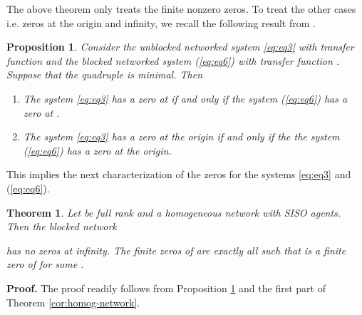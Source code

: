 \documentclass[twocolumn]{autart}    \usepackage{amsmath}
\newtheorem{theorem}{Theorem}
\newtheorem{proposition}{Proposition}
\begin{document}
\hfill 


The above theorem only treats the finite nonzero zeros. To treat the
other cases i.e. zeros at the origin and infinity, we recall the following
result from \cite{MOHSEN-SCLpaper}.

\begin{proposition}\label{thm:zeroatinfinity}
Consider the  unblocked networked  system \eqref{eq:eq3} with  transfer
function   and the  blocked networked  system  (\ref{eq:eq6})
with transfer function . Suppose that  the quadruple
 is minimal. Then
\begin{enumerate}
\item The system \eqref{eq:eq3} has a zero at    if  and only if the system (\ref{eq:eq6})  has a zero at .
\item The system \eqref{eq:eq3} has a zero at the origin if and only if the   the system (\ref{eq:eq6})  has a zero at  the origin.
\end{enumerate}
\end{proposition}

This implies the next characterization of the zeros for the systems \eqref{eq:eq3} and (\ref{eq:eq6}).

\begin{theorem}
Let  be full rank and 
a homogeneous network with SISO agents. Then the blocked network

has no zeros at infinity.  The finite zeros of
 are exactly all
 such that  is a finite zero of  for some
 .
\end{theorem}

 \noindent \textbf{Proof.}
The proof readily follows from Proposition \ref{thm:zeroatinfinity}
 and the first part of Theorem \ref{cor:homog-network}.
 \hfill 
\end{document}
